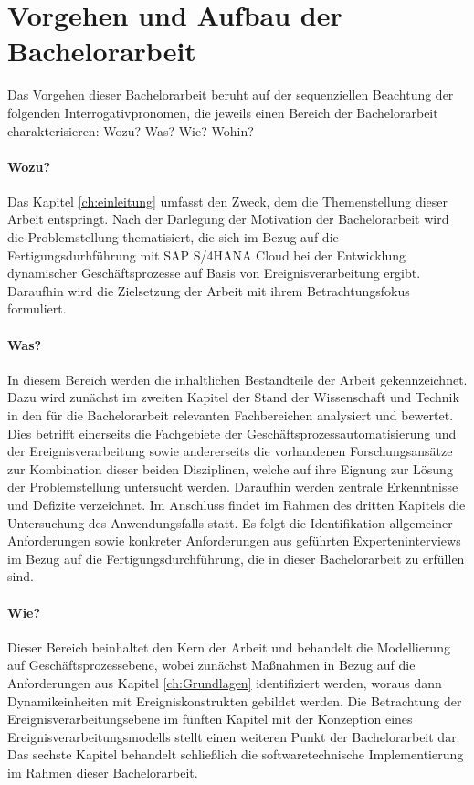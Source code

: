 \section{Vorgehen und Aufbau der Bachelorarbeit }\label{sec:Vorgehen}

Das Vorgehen dieser Bachelorarbeit beruht auf der sequenziellen Beachtung der folgenden Interrogativpronomen, die jeweils einen Bereich der Bachelorarbeit charakterisieren: Wozu? Was? Wie? Wohin?

\paragraph{Wozu?}
Das Kapitel \ref{ch:einleitung} umfasst den Zweck, dem die Themenstellung dieser Arbeit entspringt. Nach der Darlegung der Motivation der Bachelorarbeit wird die Problemstellung thematisiert, die sich im Bezug auf die Fertigungsdurhführung mit SAP S/4HANA Cloud bei der Entwicklung dynamischer Geschäftsprozesse auf Basis von Ereignisverarbeitung ergibt. Daraufhin wird die Zielsetzung der Arbeit mit ihrem Betrachtungsfokus formuliert.

\paragraph{Was?}
In diesem Bereich werden die inhaltlichen Bestandteile der Arbeit gekennzeichnet. Dazu wird zunächst im zweiten Kapitel der Stand der Wissenschaft und Technik in den für die Bachelorarbeit relevanten Fachbereichen analysiert und bewertet. Dies betrifft einerseits die Fachgebiete der Geschäftsprozessautomatisierung und der Ereignisverarbeitung sowie andererseits die vorhandenen Forschungsansätze zur Kombination dieser beiden Disziplinen, welche auf ihre Eignung zur Lösung der Problemstellung untersucht werden. Daraufhin werden zentrale Erkenntnisse und Defizite  verzeichnet. Im Anschluss findet im Rahmen des dritten Kapitels die Untersuchung des Anwendungsfalls statt. Es folgt die Identifikation allgemeiner Anforderungen sowie konkreter Anforderungen aus geführten Experteninterviews im Bezug auf die Fertigungsdurchführung, die in dieser Bachelorarbeit zu erfüllen sind.

\paragraph{Wie?} 
Dieser Bereich beinhaltet den Kern der Arbeit und behandelt die Modellierung auf Geschäftsprozessebene, wobei zunächst Maßnahmen in Bezug auf die Anforderungen aus Kapitel \ref{ch:Grundlagen} identifiziert werden, woraus dann Dynamikeinheiten mit Ereigniskonstrukten gebildet werden. Die Betrachtung der Ereignisverarbeitungsebene im fünften Kapitel mit der Konzeption eines Ereignisverarbeitungsmodells stellt einen weiteren Punkt der Bachelorarbeit dar. Das sechste Kapitel behandelt schließlich die softwaretechnische Implementierung im Rahmen dieser Bachelorarbeit. 


